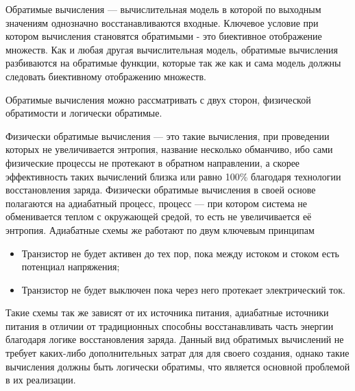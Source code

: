 \documentclass[14pt]{extarticle} %
\begin{document}
	


\newpage
\renewcommand{\baselinestretch}{1.5}
\normalsize
\renewcommand{\contentsname}{СОДЕРЖАНИЕ}
\noindent\tableofcontents

Обратимые вычисления --- вычислительная модель в которой по выходным значениям однозначно восстанавливаются входные. Ключевое условие при котором вычисления становятся обратимыми - это биективное отображение множеств. Как и любая другая вычислительная модель, обратимые вычисления разбиваются на обратимые функции, которые так же как и сама модель должны следовать биективному отображению множеств.  %

Обратимые вычисления можно рассматривать с двух сторон, физической обратимости и  логически обратимые.

Физически обратимые вычисления --- это такие вычисления, при проведении которых не увеличивается энтропия, название несколько обманчиво, ибо сами физические процессы не протекают в обратном направлении, а скорее эффективность таких вычислений близка или равно 100\% благодаря технологии восстановления заряда.  Физически обратимые вычисления в своей основе полагаются на адиабатный процесс, процесс --- при котором система не обменивается теплом с окружающей средой, то есть не увеличивается её энтропия. Адиабатные схемы же работают по двум ключевым принципам 
\begin{itemize}
	\item Транзистор не будет активен до тех пор, пока между истоком и стоком есть потенциал напряжения;
	\item Транзистор не будет выключен пока через него протекает электрический ток. 	
\end{itemize}
Такие схемы так же зависят от их источника питания, адиабатные источники питания в отличии от традиционных способны восстанавливать часть энергии благодаря логике восстановления заряда. Данный вид обратимых вычислений не требует каких-либо дополнительных затрат для для своего создания, однако такие вычисления должны быть логически обратимы, что является основной проблемой в их реализации.
 \par
\end{document}
